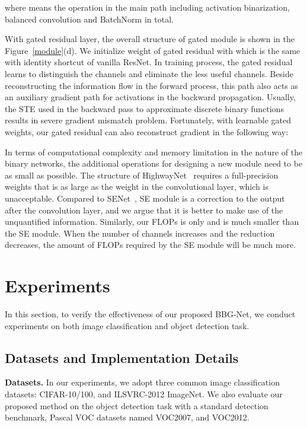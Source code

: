 \documentclass{article}
\begin{document}
where  means the operation in the main path including activation binarization, balanced convolution and BatchNorm in total.

With gated residual layer, the overall structure of gated module is shown in the Figure~\ref{module}(d). We initialize weight of gated residual with  which is the same with identity shortcut of vanilla ResNet. In training process, the gated residual learns to distinguish the channels and eliminate the less useful channels. Beside reconstructing the information flow in the forward process, this path also acts as an auxiliary gradient path for activations in the backward propagation. Usually, the STE used in the backward pass to approximate discrete binary functions results in severe gradient mismatch problem. Fortunately, with learnable gated weights, our gated residual can also reconstruct gradient in the following way:




In terms of computational complexity and memory limitation in the nature of the binary networks, the additional operations for designing a new module need to be as small as possible. The structure of HighwayNet~\cite{srivastava2015highway} requires a full-precision weights that is as large as the weight in the convolutional layer, which is unacceptable. Compared to SENet~\cite{hu2018squeeze}, SE module is a correction to the output after the convolution layer, and we argue that it is better to make use of the unquantified information. Similarly, our FLOPs is only  and is much smaller than the SE module. When the number of channels increases and the reduction decreases, the amount of FLOPs required by the SE module will be much more. 	

\section{Experiments}
In this section, to verify the effectiveness of our proposed BBG-Net, we conduct experiments on both image classification and object detection task.\subsection{Datasets and Implementation Details}

\textbf{Datasets.}
In our experiments, we adopt three common image classification datasets: CIFAR-10/100, and ILSVRC-2012 ImageNet. We also evaluate our proposed method on the object detection task with a standard detection benchmark, Pascal VOC datasets named VOC2007, and VOC2012. 
\end{document}

